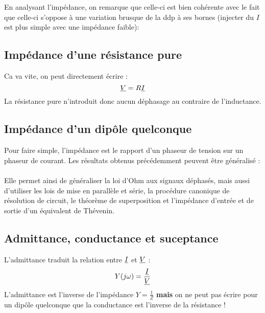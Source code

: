 \documentclass[british,french,11pt, a4paper, openany]{book}
\begin{document}
		En analysant l'impédance, on remarque que celle-ci est bien cohérente avec le fait que celle-ci s'oppose à une variation brusque de la ddp à ses bornes (injecter du $I$ est plus simple avec une impédance faible):\\
		
		
		\subsection{Impédance d'une résistance pure}
		Ca va vite, on peut directement écrire :
		\begin{equation}
		\underline{V} = R\underline{I}
		\end{equation}
		La résistance pure n'introduit donc aucun déphasage au contraire de l'inductance.
		
		\subsection{Impédance d'un dipôle quelconque}
		Pour faire simple, l'impédance est le rapport d'un phaseur de tension sur un phaseur de courant. Les résultats obtenus  précédemment peuvent être généralisé :\\
		
		\ \\
		
		Elle permet ainsi de généraliser la loi d'Ohm aux signaux déphasés, mais aussi d'utiliser les lois de mise en parallèle et série, la procédure canonique de résolution de circuit, le théorème de superposition et l'impédance d'entrée et de sortie d'un équivalent de Thévenin.
		
		\subsection{Admittance, conductance et suceptance}
		L'admittance traduit la relation entre $\underline{I}$ et $\underline{V}$ :
		\begin{equation}
		Y(j\omega) = \frac{\underline{I}}{\underline{V}}
		\end{equation}
		L'admittance est l'inverse de l'impédance $Y = \frac{1}{Z}$ \textbf{mais} on ne peut pas écrire pour un dipôle quelconque que la conductance est l'inverse de la résistance !
		
\end{document}
